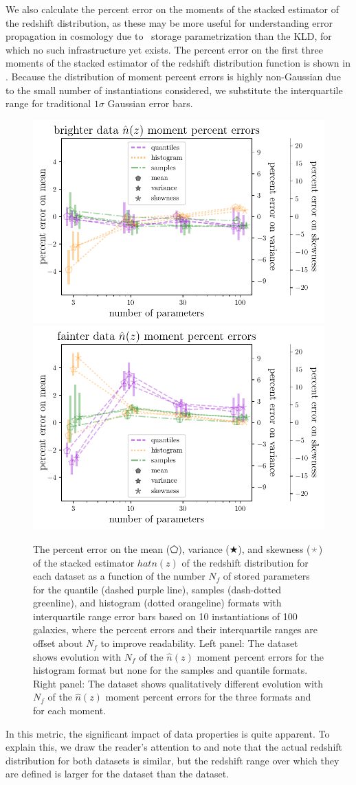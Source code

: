 We also calculate the percent error on the moments of the stacked estimator of 
the redshift distribution, as these may be more useful for understanding error 
propagation in cosmology due to \pz\ storage parametrization than the KLD, for 
which no such infrastructure yet exists.
The percent error on the first three moments of the stacked estimator of the 
redshift distribution function is shown in .
Because the distribution of moment percent errors is highly non-Gaussian due to 
the small number of instantiations considered, we substitute the interquartile 
range for traditional $1\sigma$ Gaussian error bars.
\begin{figure}
	\begin{center}
		\includegraphics[width=0.49\columnwidth]{figures/qp/graham_nz_err.pdf}    
		\includegraphics[width=0.49\columnwidth]{figures/qp/schmidt_nz_err.pdf}
		\caption{
			The percent error on the mean ($\pentagon$), variance ($\bigstar$), and 
			skewness ($\APLstar$) of the stacked estimator $hat{n}(z)$ of the redshift 
			distribution for each dataset as a function of the number $N_{f}$ of stored 
			parameters for the quantile (dashed purple line), samples (dash-dotted 
			greenline), and histogram (dotted orangeline) formats with interquartile range 
			error bars based on 10 instantiations of 100 galaxies, where the percent errors 
			and their interquartile ranges are offset about $N_{f}$ to improve readability.
			Left panel: The \mgdata dataset shows evolution with $N_{f}$ of the 
			$\hat{n}(z)$ moment percent errors for the histogram format but none for the 
			samples and quantile formats.
			Right panel: The \ssdata dataset shows qualitatively different evolution 
			with $N_{f}$ of the $\hat{n}(z)$ moment percent errors for the three formats 
			and for each moment.
			}
	\end{center}
\end{figure}
In this metric, the significant impact of data properties is quite apparent.
To explain this, we draw the reader's attention to  and 
note that the actual redshift distribution for both datasets is similar, but 
the redshift range over which they are defined is larger for the \mgdata 
dataset than the \ssdata dataset.

